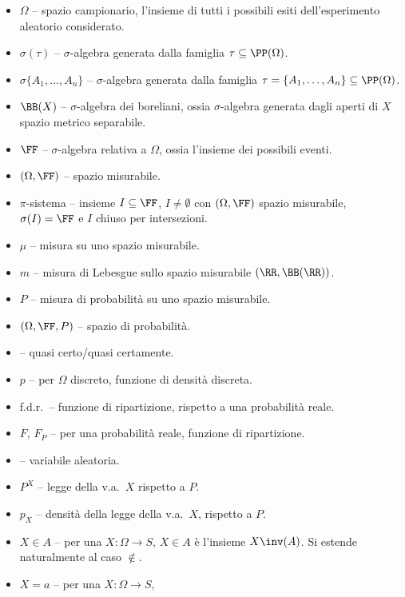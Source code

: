 \begin{multicols*}{2}
    \begin{itemize}
        \item $\Omega$ -- spazio campionario, l'insieme di tutti i possibili esiti dell'esperimento aleatorio considerato.
        \item $\sigma(\tau)$ -- $\sigma$-algebra generata dalla famiglia $\tau \subseteq \PP(\Omega)$.
        \item $\sigma\{A_1, \ldots, A_n\}$ -- $\sigma$-algebra generata dalla famiglia
        $\tau = \{A_1, \ldots, A_n\} \subseteq \PP(\Omega)$.
        \item $\BB(X)$ -- $\sigma$-algebra dei boreliani, ossia $\sigma$-algebra generata dagli aperti di $X$ spazio metrico separabile.
        \item $\FF$ -- $\sigma$-algebra relativa a $\Omega$, ossia l'insieme dei possibili eventi.
        \item $(\Omega, \FF)$ -- spazio misurabile.
        \item $\pi$-sistema -- insieme $I \subseteq \FF$, $I \neq \emptyset$ con $(\Omega, \FF)$ spazio misurabile, $\sigma(I) = \FF$ e $I$ chiuso per intersezioni.
        \item $\mu$ -- misura su uno spazio misurabile.
        \item $m$ -- misura di Lebesgue sullo spazio misurabile $(\RR, \BB(\RR))$.
        \item $P$ -- misura di probabilità su uno spazio misurabile.
        \item $(\Omega, \FF, P)$ -- spazio di probabilità.
        \item \qc -- quasi certo/quasi certamente.
        \item $p$ -- per $\Omega$ discreto, funzione di densità discreta.
        \item f.d.r.~-- funzione di ripartizione, rispetto a una probabilità reale.
        \item $F$, $F_P$ -- per una probabilità reale, funzione di ripartizione.
        \item \va -- variabile aleatoria.
        \item $P^X$ -- legge della v.a.~$X$ rispetto a $P$.
        \item $p_X$ -- densità della legge della v.a.~$X$, rispetto a $P$.
        \item $X \in A$ -- per una \va $X : \Omega \to S$,
        $X \in A$ è l'insieme $X\inv(A)$. Si estende naturalmente
        al caso $\notin$.
        \item $X = a$ -- per una \va $X : \Omega \to S$,

\end{itemize}
\end{multicols*}
